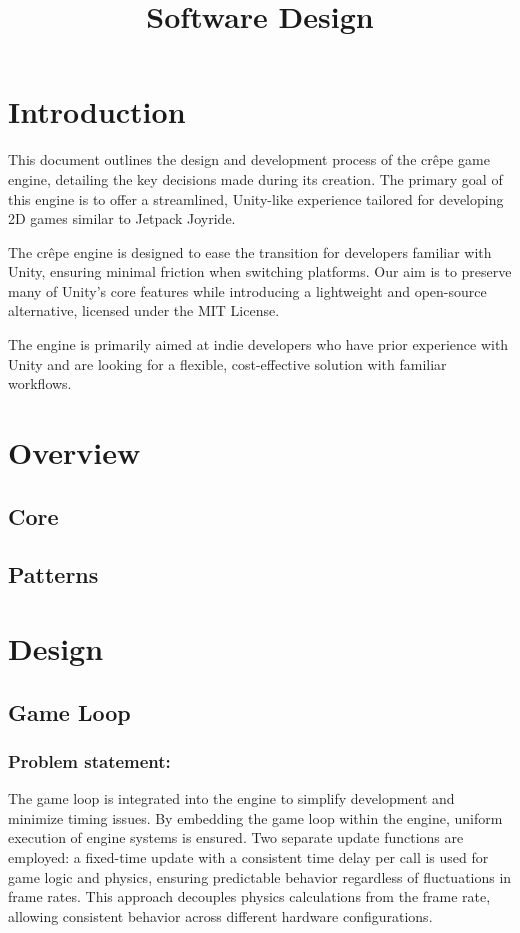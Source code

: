 \documentclass{projdoc}
\title{Software Design}
\begin{document}
\tablestables
\newpage

\section{Introduction}

This document outlines the design and development process of the cr\^epe game engine,
detailing the key decisions made during its creation. The primary goal of this engine
is to offer a streamlined, Unity-like experience tailored for developing 2D games
similar to Jetpack Joyride.

The cr\^epe engine is designed to ease the transition for developers familiar with
Unity, ensuring minimal friction when switching platforms. Our aim is to preserve
many of Unity’s core features while introducing a lightweight and open-source
alternative, licensed under the MIT License.

The engine is primarily aimed at indie developers who have prior experience with
Unity and are looking for a flexible, cost-effective solution with familiar
workflows.

\section{Overview}

\subsection{Core}

\subsection{Patterns}

\section{Design}
\subsection{Game Loop}
\subsubsection{Problem statement:}
The game loop is integrated into the engine to simplify development and minimize timing issues. By embedding the game loop within the engine, uniform execution of engine systems is ensured.
Two separate update functions are employed: a fixed-time update with a consistent time delay per call is used for game logic and physics, ensuring predictable behavior regardless of fluctuations in frame rates.
This approach decouples physics calculations from the frame rate, allowing consistent behavior across different hardware configurations.
\end{document}
